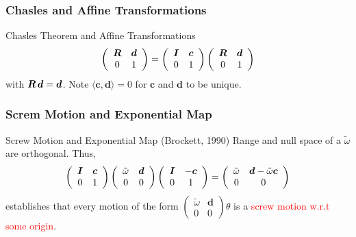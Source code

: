 \begin{frame}
	\frametitle{Chasles and Affine Transformations}	
	\begin{block}{Chasles Theorem and Affine Transformations}
		\begin{align}
			\left(
			\begin{array}{cc}
				\bm{R} & \bm{d} \\
				0 & 1
			\end{array}
			\right) = \left(
			\begin{array}{cc}
				\bm{I} & \bm{c} \\
				0 & 1
			\end{array}
			\right)
			\left(
			\begin{array}{cc}
				\bm{R} & \bm{d} \\
				0 & 1
			\end{array}
			\right)
		\end{align}
		with $\bm{R}\, \bm{d}=\bm{d}$. Note $\langle \bm{c}, \bm{d}\rangle=0$ for $\bm{c}$ and $\bm{d}$ to be unique.
	\end{block}
\end{frame}


\begin{frame}
	\frametitle{Screm Motion and Exponential Map}	
	\begin{block}{Screw Motion and Exponential Map (Brockett, 1990)}
		Range and null space of a $\tilde{\omega}$ are orthogonal. Thus,
		\begin{align}
			\left(\begin{array}{cc}
				\bm{I} & \bm{c} \\
				0 & 1
			\end{array}\right)
			\left(\begin{array}{cc}
				\tilde{\omega} & \bm{d} \\
				0 & 0
			\end{array}\right)
			\left(\begin{array}{cc}
					\bm{I} & -\bm{c} \\
					0 & 1
			\end{array}\right) = 
			\left(\begin{array}{cc}
				\tilde{\omega} & \bm{d}-\tilde{\omega}\bm{c} \\
				0 & 0
			\end{array}\right)
		\end{align}
		 establishes that every motion of the form $\left(\begin{array}{cc}
		 	\tilde{\omega} & \bm{d} \\
		 	0 & 0
		 \end{array}\right)\theta$ is a \textcolor{red}{screw motion w.r.t some origin}.
	\end{block}
\end{frame}


